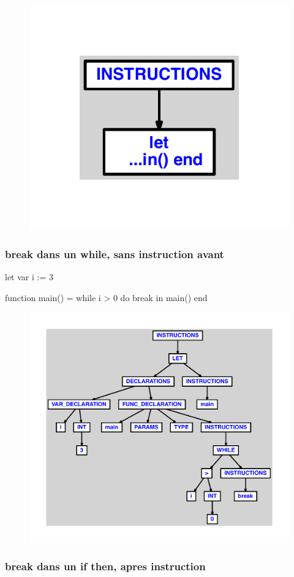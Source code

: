 \documentclass{article}
\begin{document}
\begin{figure}[H]\centering\includegraphics[max width=\textwidth]{ast/ast_14.pdf}\end{figure}\subsubsection{break dans un while, sans instruction avant}
\begin{verbatimtab}
let
	var i := 3

	function main() =
		while i > 0 do
			break
in main() end
\end{verbatimtab}
\begin{figure}[H]\centering\includegraphics[max width=\textwidth]{ast/ast_15.pdf}\end{figure}\subsubsection{break dans un if then, apres instruction}
\end{document}
